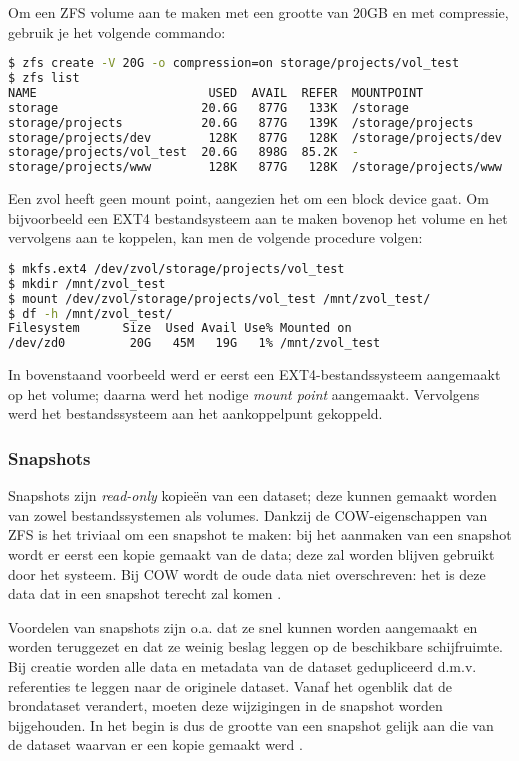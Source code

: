 \clearpage

Om een ZFS volume aan te maken met een grootte van 20GB en met compressie, gebruik je het volgende commando:

\begin{lstlisting}[language=bash,style=command_style] 
$ zfs create -V 20G -o compression=on storage/projects/vol_test
$ zfs list
NAME                        USED  AVAIL  REFER  MOUNTPOINT
storage                    20.6G   877G   133K  /storage
storage/projects           20.6G   877G   139K  /storage/projects
storage/projects/dev        128K   877G   128K  /storage/projects/dev
storage/projects/vol_test  20.6G   898G  85.2K  -
storage/projects/www        128K   877G   128K  /storage/projects/www
\end{lstlisting}

Een zvol heeft geen mount point, aangezien het om een block device gaat. Om bijvoorbeeld een EXT4 bestandsysteem aan te maken bovenop het volume en het vervolgens aan te koppelen, kan men de volgende procedure volgen:

\begin{lstlisting}[language=bash,style=command_style] 
$ mkfs.ext4 /dev/zvol/storage/projects/vol_test
$ mkdir /mnt/zvol_test
$ mount /dev/zvol/storage/projects/vol_test /mnt/zvol_test/
$ df -h /mnt/zvol_test/
Filesystem      Size  Used Avail Use% Mounted on
/dev/zd0         20G   45M   19G   1% /mnt/zvol_test
\end{lstlisting}

In bovenstaand voorbeeld werd er eerst een EXT4-bestandssysteem aangemaakt op het volume; daarna werd het nodige \textit{mount point} aangemaakt. Vervolgens werd het bestandssysteem aan het aankoppelpunt gekoppeld.  

\subsubsection{Snapshots}

Snapshots zijn \textit{read-only} kopieën van een dataset; deze kunnen gemaakt worden van zowel bestandssystemen als volumes. Dankzij de COW-eigenschappen van ZFS is het triviaal om een snapshot te maken: bij het aanmaken van een snapshot wordt er eerst een kopie gemaakt van de data; deze zal worden blijven gebruikt door het systeem. Bij COW wordt de oude data niet overschreven: het is deze data dat in een snapshot terecht zal komen \autocite{Lucas2015}.

Voordelen van snapshots zijn o.a. dat ze snel kunnen worden aangemaakt en worden teruggezet en dat ze weinig beslag leggen op de beschikbare schijfruimte. Bij creatie worden alle data en metadata van de dataset gedupliceerd d.m.v. referenties te leggen naar de originele dataset. Vanaf het ogenblik dat de brondataset verandert, moeten deze wijzigingen in de snapshot worden bijgehouden. In het begin is dus de grootte van een snapshot gelijk aan die van de dataset waarvan er een kopie gemaakt werd \autocite{FBSDDP2017}.

